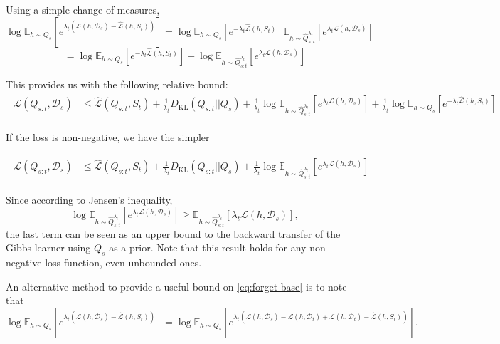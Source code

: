 \documentclass[letterpaper]{article}
\theoremstyle{definition}
\begin{document}
Using a simple change of measures, 
$$\log\mathbb{E}_{h\sim Q_{s}}\left [e^{\lambda_t(\mathcal{L}(h,\mathcal{D}_s)-\hat{\mathcal{L}}(h,S_t))} \right ]=\log \mathbb{E}_{h\sim Q_s}\left [e^{-\lambda_t\hat{\mathcal{L}}(h,S_t)} \right ] \mathbb{E}_{h\sim \hat{Q}_{s:t}^{\lambda_t}}\left [e^{\lambda_t\mathcal{L}(h,\mathcal{D}_s)} \right ]$$
$$=\log \mathbb{E}_{h\sim Q_s}\left [e^{-\lambda_t\hat{\mathcal{L}}(h,S_t)} \right ]+\log \mathbb{E}_{h\sim \hat{Q}_{s:t}^{\lambda_t}}\left [e^{\lambda_t\mathcal{L}(h,\mathcal{D}_s)} \right ]$$

This provides us with the following relative bound:
\begin{align*}
\begin{split}
\mathcal{L}(Q_{s:t}, \mathcal{D}_s) &\leq \hat{\mathcal{L}}(Q_{s:t}, S_t) + \frac{1}{\lambda_t} D_{\mathrm{KL}}(Q_{s:t}||Q_{s})
+\frac{1}{\lambda_t}\log \mathbb{E}_{h\sim \hat{Q}_{s:t}^{\lambda_t}}\left [e^{\lambda_t\mathcal{L}(h,\mathcal{D}_s)}\right ]+\frac{1}{\lambda_t}\log \mathbb{E}_{h\sim Q_s}\left [e^{-\lambda_t\hat{\mathcal{L}}(h,S_t)} \right ]
\end{split}
\end{align*}

If the loss is non-negative, we have the simpler

\begin{align}
\begin{split}
\mathcal{L}(Q_{s:t}, \mathcal{D}_s) &\leq \hat{\mathcal{L}}(Q_{s:t}, S_t) + \frac{1}{\lambda_t} D_{\mathrm{KL}}(Q_{s:t}||Q_{s})
+\frac{1}{\lambda_t}\log \mathbb{E}_{h\sim \hat{Q}_{s:t}^{\lambda_t}}\left [e^{\lambda_t\mathcal{L}(h,\mathcal{D}_s)}\right ]
\end{split}
\end{align}

Since according to Jensen's inequality, $$\log \mathbb{E}_{h\sim \hat{Q}_{s:t}^{\lambda_t}}\left [e^{\lambda_t\mathcal{L}(h,\mathcal{D}_s)}\right ]\geq \mathbb{E}_{h\sim \hat{Q}_{s:t}^{\lambda_t}}\left [\lambda_t\mathcal{L}(h,\mathcal{D}_s)\right ],$$
the last term can be seen as an upper bound to the backward transfer of the Gibbs learner using $Q_s$ as a prior. Note that this result holds for any non-negative loss function, even unbounded ones.

An alternative method to provide a useful bound on \eqref{eq:forget-base} is to note that
$$\log\mathbb{E}_{h\sim Q_{s}}\left [e^{\lambda_t(\mathcal{L}(h,\mathcal{D}_s)-\hat{\mathcal{L}}(h,S_t))} \right ] = \log\mathbb{E}_{h\sim Q_{s}}\left [e^{\lambda_t(\mathcal{L}(h,\mathcal{D}_s)-\mathcal{L}(h,\mathcal{D}_t)+\mathcal{L}(h,\mathcal{D}_t)-\hat{\mathcal{L}}(h,S_t))} \right ].$$
\end{document}
